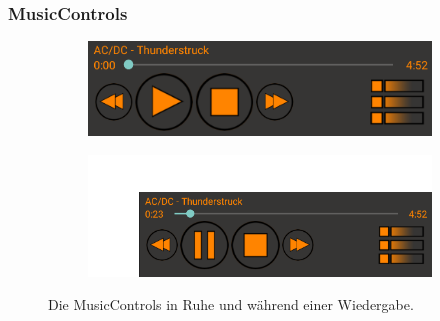\documentclass[FIPLY_base.tex]{subfiles}
\begin{document}
\newpage
\subsubsection { MusicControls}

\begin{figure}[H]
	\begin{subfigure}[b]{0.3\textwidth}
	\includegraphics[scale=0.55]{img/musicControls}
	\end{subfigure}
	\hfil
	\begin{subfigure}[b]{0.3\textwidth}
	\includegraphics[scale=0.55]{img/musicControlsPlaying}
	\end{subfigure}
	\caption{Die MusicControls in Ruhe und während einer Wiedergabe.}
\end{figure}
\end{document}
